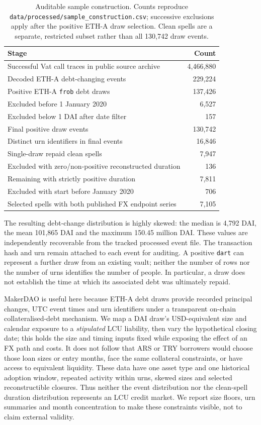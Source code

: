 \documentclass[sn-vancouver,Numbered]{sn-jnl}
\begin{document}
\begin{table}[htbp]
\caption{Auditable sample construction. Counts reproduce \texttt{data/processed/sample\_construction.csv}; successive exclusions apply after the positive ETH-A draw selection. Clean spells are a separate, restricted subset rather than all 130,742 draw events.}
\label{tab:construction}\centering\small
\begin{tabular}{lr}
\toprule
Stage & Count \\
\midrule
Successful Vat call traces in public source archive & 4,466,880 \\
Decoded ETH-A debt-changing events & 229,224 \\
Positive ETH-A \texttt{frob} debt draws & 137,426 \\
Excluded before 1 January 2020 & 6,527 \\
Excluded below 1 DAI after date filter & 157 \\
Final positive draw events & 130,742 \\
Distinct urn identifiers in final events & 16,846 \\
Single-draw repaid clean spells & 7,947 \\
Excluded with zero/non-positive reconstructed duration & 136 \\
Remaining with strictly positive duration & 7,811 \\
Excluded with start before January 2020 & 706 \\
Selected spells with both published FX endpoint series & 7,105 \\
\bottomrule
\end{tabular}
\end{table}
The resulting debt-change distribution is highly skewed: the median is 4,792 DAI, the mean 101,865 DAI and the maximum 150.45 million DAI. These values are independently recoverable from the tracked processed event file. The transaction hash and urn remain attached to each event for auditing. A positive \texttt{dart} can represent a further draw from an existing vault; neither the number of rows nor the number of urns identifies the number of people. In particular, a draw does not establish the time at which its associated debt was ultimately repaid.

MakerDAO is useful here because ETH-A debt draws provide recorded principal changes, UTC event times and urn identifiers under a transparent on-chain collateralised-debt mechanism. We map a DAI draw's USD-equivalent size and calendar exposure to a \emph{stipulated} LCU liability, then vary the hypothetical closing date; this holds the size and timing inputs fixed while exposing the effect of an FX path and costs. It does not follow that ARS or TRY borrowers would choose those loan sizes or entry months, face the same collateral constraints, or have access to equivalent liquidity. These data have one asset type and one historical adoption window, repeated activity within urns, skewed sizes and selected reconstructible closures. Thus neither the event distribution nor the clean-spell duration distribution represents an LCU credit market. We report size floors, urn summaries and month concentration to make these constraints visible, not to claim external validity.
\end{document}
